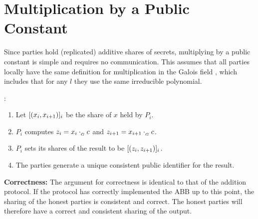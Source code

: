 \section{Multiplication by a Public Constant}

Since parties hold (replicated) additive shares of secrets, 
multiplying by a public constant is simple and requires no communication.
This assumes that all parties locally have the same definition
for multiplication in the Galois field \GFtwol,
which includes that for any $l$ they use the same irreducible polynomial.

\begin{protocol}
	:
		\begin{enumerate}
			\item Let $[(x_i, x_{i+1})]_{i}$
				be the share of $x$ held by $P_i$.
			\item $P_i$ computes $z_i = x_i \cdot_{_G} c$ and
				$z_{i+1} = x_{i+1} \cdot_{_G} c$.
			\item $P_i$ sets its shares of the result to be
				$[(z_i, z_{i+1})]_{i}$.
			\item The parties generate a unique consistent
				public identifier for the result.
		\end{enumerate}
\end{protocol}

\textbf{Correctness:}
The argument for correctness is identical to that of the addition protocol.
If the protocol has correctly implemented the ABB up to this point,
the sharing of the honest parties is consistent and correct.
The honest parties will therefore have a correct and consistent
sharing of the output.

